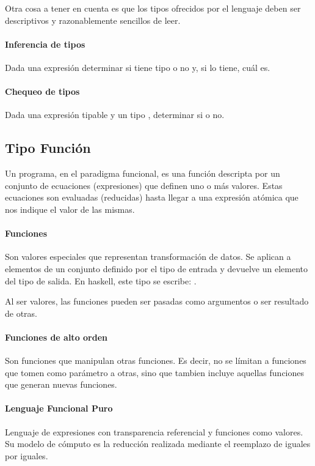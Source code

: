 Otra cosa a tener en cuenta es que los tipos ofrecidos por el lenguaje deben ser descriptivos y razonablemente sencillos de leer.

\paragraph{Inferencia de tipos} Dada una expresión  determinar si tiene tipo o no y, si lo tiene, cuál es.

\paragraph{Chequeo de tipos} Dada una expresión tipable  y un tipo , determinar si  o no.

\subsection{Tipo Función}
Un programa, en el paradigma funcional, es una función descripta por un conjunto de ecuaciones (expresiones) que definen uno o más valores. Estas ecuaciones son evaluadas (reducidas) hasta llegar a una expresión atómica que nos indique el valor de las mismas.

\paragraph{Funciones} Son valores especiales que representan transformación de datos. Se aplican a elementos de un conjunto definido por el tipo de entrada y devuelve un elemento del tipo de salida. En haskell, este tipo se escribe:  .

Al ser valores, las funciones pueden ser pasadas como argumentos o ser resultado de otras.

\paragraph{Funciones de alto orden} Son funciones que manipulan otras funciones. Es decir, no se límitan a funciones que tomen como parámetro a otras, sino que tambien incluye aquellas funciones que generan nuevas funciones.

\paragraph{Lenguaje Funcional Puro} Lenguaje de expresiones con transparencia referencial y funciones como valores. Su modelo de cómputo es la reducción realizada mediante el reemplazo de iguales por iguales.

